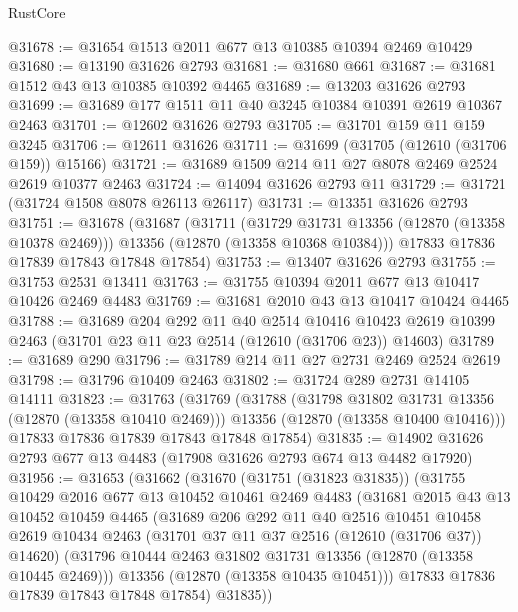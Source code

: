 \begin{lexlean}{RustCore}
\begin{coremodule}
@31678 := @31654 @1513 @2011 @677 @13 @10385 @10394 @2469 @10429
@31680 := @13190 @31626 @2793
@31681 := @31680 @661
@31687 := @31681 @1512 @43 @13 @10385 @10392 @4465
@31689 := @13203 @31626 @2793
@31699 := @31689 @177 @1511 @11 @40 @3245 @10384 @10391 @2619 @10367 @2463
@31701 := @12602 @31626 @2793
@31705 := @31701 @159 @11 @159 @3245
@31706 := @12611 @31626
@31711 := @31699 (@31705 (@12610 (@31706 @159)) @15166)
@31721 := @31689 @1509 @214 @11 @27 @8078 @2469 @2524 @2619 @10377 @2463
@31724 := @14094 @31626 @2793 @11
@31729 := @31721 (@31724 @1508 @8078 @26113 @26117)
@31731 := @13351 @31626 @2793
@31751 := @31678
    (@31687
      (@31711
        (@31729 @31731 @13356 (@12870 (@13358 @10378 @2469)))
        @13356
        (@12870 (@13358 @10368 @10384)))
      @17833
      @17836
      @17839
      @17843
      @17848
      @17854)
@31753 := @13407 @31626 @2793
@31755 := @31753 @2531 @13411
@31763 := @31755 @10394 @2011 @677 @13 @10417 @10426 @2469 @4483
@31769 := @31681 @2010 @43 @13 @10417 @10424 @4465
@31788 := @31689
    @204
    @292
    @11
    @40
    @2514
    @10416
    @10423
    @2619
    @10399
    @2463
    (@31701 @23 @11 @23 @2514 (@12610 (@31706 @23)) @14603)
@31789 := @31689 @290
@31796 := @31789 @214 @11 @27 @2731 @2469 @2524 @2619
@31798 := @31796 @10409 @2463
@31802 := @31724 @289 @2731 @14105 @14111
@31823 := @31763
    (@31769
      (@31788
        (@31798 @31802 @31731 @13356 (@12870 (@13358 @10410 @2469)))
        @13356
        (@12870 (@13358 @10400 @10416)))
      @17833
      @17836
      @17839
      @17843
      @17848
      @17854)
@31835 := @14902 @31626 @2793 @677 @13 @4483 (@17908 @31626 @2793 @674 @13 @4482 @17920)
@31956 := @31653
    (@31662
      (@31670
        (@31751 (@31823 @31835))
        (@31755
          @10429
          @2016
          @677
          @13
          @10452
          @10461
          @2469
          @4483
          (@31681
            @2015
            @43
            @13
            @10452
            @10459
            @4465
            (@31689
              @206
              @292
              @11
              @40
              @2516
              @10451
              @10458
              @2619
              @10434
              @2463
              (@31701 @37 @11 @37 @2516 (@12610 (@31706 @37)) @14620)
              (@31796 @10444 @2463 @31802 @31731 @13356 (@12870 (@13358 @10445 @2469)))
              @13356
              (@12870 (@13358 @10435 @10451)))
            @17833
            @17836
            @17839
            @17843
            @17848
            @17854)
          @31835))

\end{coremodule}
\end{lexlean}

